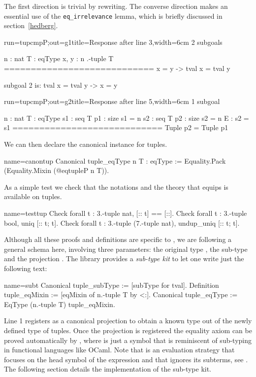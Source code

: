 The first direction is trivial by rewriting.
The converse direction makes an essential use of
the \lstinline/eq_irrelevance/ lemma, which is briefly discussed
in section~\ref{hedberg}.

\begin{coqout}{run=tupcmpP;out=g1}{title=Response after line 3,width=6cm}
2 subgoals

n : nat
T : eqType
x, y : n .-tuple T
============================
x = y -> tval x = tval y

subgoal 2 is:
  tval x = tval y -> x = y
$~$
\end{coqout}
\begin{coqout}{run=tupcmpP;out=g2}{title=Response after line 5,width=6cm}
1 subgoal

n : nat
T : eqType
s1 : seq T
p1 : size s1 = n
s2 : seq T
p2 : size s2 = n
E : s2 = s1
============================
Tuple p2 = Tuple p1
\end{coqout}

We can then declare the canonical  instance for tuples.

\begin{coq}{name=canontup}{}
Canonical tuple_eqType n T : eqType :=
  Equality.Pack (Equality.Mixin (@eqtupleP n T)).
\end{coq}

As a simple test we check that the notations and the theory
that equips  is available on tuples.

\begin{coq}{name=testtup}{}
Check forall t : 3.-tuple nat, [:: t] == [::].
Check forall t : 3.-tuple bool, uniq [:: t; t].
Check forall t : 3.-tuple (7.-tuple nat), undup_uniq [:: t; t].
\end{coq}

Although all these proofs and definitions are specific to ,
we are following a general schema here, involving
three parameters: the original type , the sub-type
 and the projection .
The \mcbMC{} library provides a \emph{sub-type kit} to let one
write just the following text:

\begin{coq}{name=subt}{}
Canonical tuple_subType := [subType for tval].
Definition tuple_eqMixin := [eqMixin of n.-tuple T by <:].
Canonical tuple_eqType := EqType (n.-tuple T) tuple_eqMixin.
\end{coq}

Line 1 registers  as a canonical projection to obtain a known
type out of the newly defined type of tuples.  Once the projection
is registered the equality axiom can be proved automatically by
, where \C{<:} is just a symbol
that is reminiscent of sub-typing in functional languages like OCaml.
Note that  is an evaluation strategy that focuses on the head
symbol of the expression and that ignores its subterms, see \cite[section
5.3.7, ``Performing computations'']{Coq:manual}.
The following section details the implementation of the sub-type kit.


